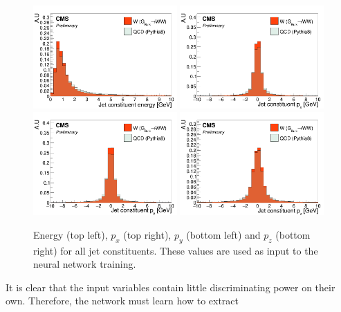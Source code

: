\begin{figure}[h!]
\centering
\includegraphics[width=0.49\textwidth]{figures/vtagging/AN-18-099/input/inputs/sig-bkg/pe.png}
\includegraphics[width=0.49\textwidth]{figures/vtagging/AN-18-099/input/inputs/sig-bkg/ppx.png}\\
\includegraphics[width=0.49\textwidth]{figures/vtagging/AN-18-099/input/inputs/sig-bkg/ppy.png}
\includegraphics[width=0.49\textwidth]{figures/vtagging/AN-18-099/input/inputs/sig-bkg/ppz.png}
\caption{Energy (top left), $p_x$ (top right), $p_y$ (bottom left) and $p_z$ (bottom right) for all jet constituents. These values are used as input to the neural network training.}
\label{fig:lola:inputs}
\end{figure}
It is clear that the input variables contain little discriminating power on their own. Therefore, the network must learn how to extract
